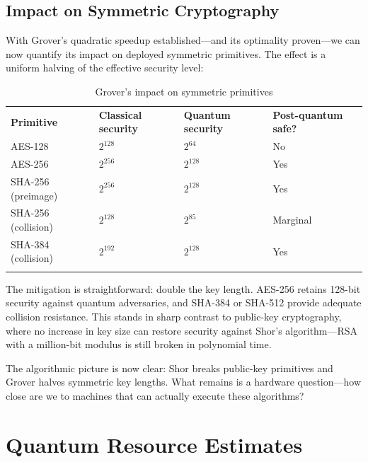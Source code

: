 \subsection{Impact on Symmetric Cryptography}
\label{subsec:grover-impact}

With Grover's quadratic speedup established---and its optimality proven---we can now quantify its impact on deployed symmetric primitives.  The effect is a uniform halving of the effective security level:

\begin{table}[t]
\caption{Grover's impact on symmetric primitives}
\label{tab:grover-impact}
\begin{tabular}{p{3cm}p{2.5cm}p{2.5cm}p{2.5cm}}
\hline\noalign{\smallskip}
\textbf{Primitive} & \textbf{Classical security} & \textbf{Quantum security} & \textbf{Post-quantum safe?} \\
\noalign{\smallskip}\svhline\noalign{\smallskip}
AES-128 & $2^{128}$ & $2^{64}$ & No \\
AES-256 & $2^{256}$ & $2^{128}$ & Yes \\
SHA-256 (preimage) & $2^{256}$ & $2^{128}$ & Yes \\
SHA-256 (collision) & $2^{128}$ & $2^{85}$ & Marginal \\
SHA-384 (collision) & $2^{192}$ & $2^{128}$ & Yes \\
\noalign{\smallskip}\hline
\end{tabular}
\end{table}

The mitigation is straightforward: double the key length.  AES-256 retains 128-bit security against quantum adversaries, and SHA-384 or SHA-512 provide adequate collision resistance.  This stands in sharp contrast to public-key cryptography, where no increase in key size can restore security against Shor's algorithm---RSA with a million-bit modulus is still broken in polynomial time.

The algorithmic picture is now clear: Shor breaks public-key primitives and Grover halves symmetric key lengths.  What remains is a hardware question---how close are we to machines that can actually execute these algorithms?


\section{Quantum Resource Estimates}
\label{sec:resource-estimates}

